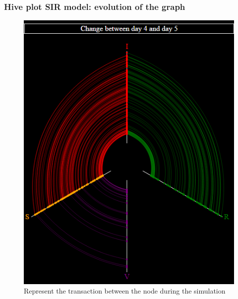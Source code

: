 \documentclass{beamer}
\begin{document}

\begin{frame}
\frametitle{Hive plot SIR model: evolution of the graph}
\begin{figure}[H]\label{fig:perc_diff}
\centering	
\includegraphics[scale=0.45]{img/vacc.PNG}

\caption{Represent the transaction between the node during the simulation}
\end{figure}
\end{frame}

\end{document}
